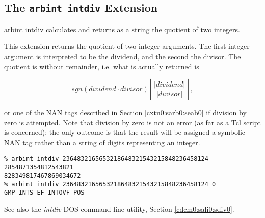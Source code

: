 \subsection{The \texttt{arbint intdiv} Extension}
\label{cxtn0:sarb0:sdiv0}

\begin{tclcommandname}{arbint intdiv}%
calculates and returns as a string the quotient of two integers.
\end{tclcommandname}

\begin{tclcommandsynopsis}
\end{tclcommandsynopsis}

\begin{tclcommanddescription}
This extension returns the quotient of two integer arguments.
The first integer argument is interpreted to be the dividend,
and the second the divisor.  The quotient is without remainder,
i.e. what is actually returned is

\begin{equation}
sgn(dividend \cdot divisor) 
\left\lfloor{\frac{|dividend|}{|divisor|}}\right\rfloor ,
\end{equation}

or one of the NAN tags described in
Section \ref{cxtn0:sarb0:seab0}
if division by zero is attempted.  Note that division
by zero is not an error (as far as a Tcl script is concerned):
the only outcome is that the result will be assigned a symbolic
NAN tag rather than a string of digits representing an integer.
\end{tclcommanddescription}

\begin{tclcommandsampleinvocations}
\begin{scriptsize}
\begin{verbatim}
% arbint intdiv 2364832165653218648321543215848236458124 2854871354812543821
828349817467869034672
% arbint intdiv 2364832165653218648321543215848236458124 0
GMP_INTS_EF_INTOVF_POS
\end{verbatim}
\end{scriptsize}
\end{tclcommandsampleinvocations}

\begin{tclcommandseealso}
See also the \emph{intdiv} DOS command-line utility, 
Section \ref{cdcm0:sali0:sdiv0}.
\end{tclcommandseealso}


